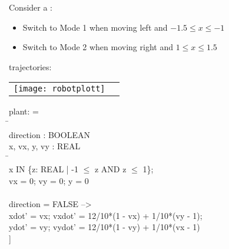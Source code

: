 \documentclass{seminar}
\begin{document}
\begin{slide}

Consider a {}:
\begin{itemize}
\item Switch to Mode 1 when moving left and $-1.5 \leq x \leq -1$
\item Switch to Mode 2 when moving right and $1 \leq x \leq 1.5$
\end{itemize}

{} trajectories:

\begin{center}
\begin{tabular}{c@{\qquad}c}
\texttt{[image: robotplott]}
&
\end{tabular}
\end{center}

\end{slide}
\begin{slide}

\begin{small}
\begin{tt}
\begin{tabbing}
 plant: {} =
\\ 
 {}\={}
\\ \>
 {} direction : BOOLEAN  %
\\ \>
 {} x, vx, y, vy : REAL
\\ \>
 {}\={}
\\ \> \>
  x IN \{z: REAL | -1 $\leq$ z AND z $\leq$ 1\};
\\ \> \>
  vx = 0; vy = 0; y = 0
\\ \>
 {}
\\ \>
 [  di\=rection = TRUE  -->
\\ \> \>
     xdot' = vx;  vxdot' = -12/10*(1 + vx) + 1/10*(vy - 1);
\\ \> \>
     ydot' = vy;  vydot' = 12/10*(1 - vy) + 1/10*(vx + 1)
\\ \> 
 [] direction = FALSE  -->
\\ \> \>
     xdot' = vx;  vxdot' = 12/10*(1 - vx) + 1/10*(vy - 1);
\\ \> \>
     ydot' = vy;  vydot' = 12/10*(1 - vy) + 1/10*(vx - 1)
\\ \>
 ]
\\
 {}
\end{tabbing}
\end{tt}
\end{small}

\end{slide}
\end{document}
